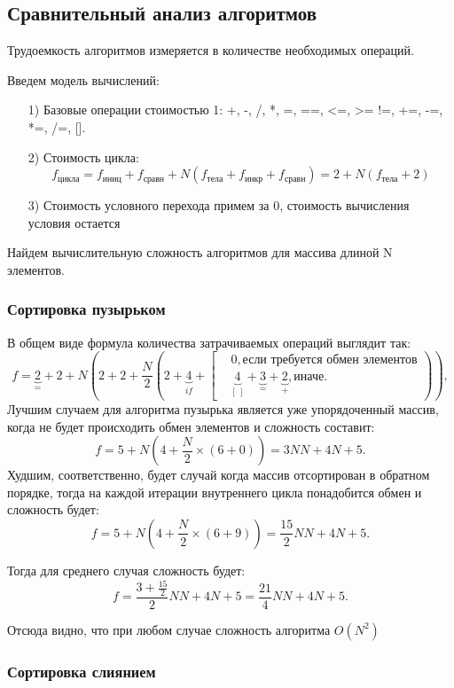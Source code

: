 \documentclass[a4paper,12pt]{article}
\begin{document}
	\subsection{Сравнительный анализ алгоритмов}
	 \label{fig:an_alg}
		Трудоемкость алгоритмов измеряется в количестве необходимых операций.
		
		Введем модель вычислений:
		\begin{enumerate}
		\item[1)] Базовые операции стоимостью 1: +, -, /, *, =, ==, <=, >= !=, +=, -=, *=, /=, [\:].
		\item[2)] Стоимость цикла:
		\[
		f_{\text{цикла}} = f_{\text{иниц}} + f_{\text{сравн}} + N(f_{\text{тела}} + f_{\text{инкр}} + f_{\text{сравн}}) = 2 + N(f_{\text{тела}} + 2)
		\]
		\item[3)]  Стоимость условного перехода примем за 0, стоимость вычисления условия остается
		
		\end{enumerate}
		Найдем вычислительную сложность алгоритмов для массива длиной N элементов.
		\subsubsection{Сортировка пузырьком}
		В общем виде формула количества затрачиваемых операций выглядит так:
		\[
			f = \underbrace{2}_{=} + 2 + N\left(2 + 2 +\frac{N}{2}\left(2 + \underbrace{4}_{if} + 				\left [
		\begin{aligned}
		&0,  \text{если требуется обмен элементов} \\
		&\underbrace{4}_{[\:]} + \underbrace{3}_{=} + \underbrace{2}_{+}, \text{иначе}.
		\end{aligned}
		\right.\right)\right),		
		\]
		Лучшим случаем для алгоритма пузырька является уже упорядоченный массив, когда не будет происходить обмен элементов и сложность составит:
		\[
		f = 5 + N(4 +\frac{N}{2}\times(6 + 0)) = 3NN + 4N + 5.		
		\]
		Худшим, соответственно, будет случай когда массив отсортирован в обратном порядке, тогда на каждой итерации внутреннего цикла понадобится обмен и сложность будет:
		\[
		f = 5 + N(4 +\frac{N}{2}\times(6 + 9)) = \frac{15}{2}NN + 4N + 5.			
		\]
		
		Тогда для среднего случая сложность будет:
		\[
		f =  \frac{3  + \frac{15}{2}}{2}NN + 4N + 5	= \frac{21}{4}NN + 4N + 5.	
		\]
		
		Отсюда видно, что при любом случае сложность алгоритма $O(N^2)$
		\subsubsection{Сортировка слиянием}
		
\end{document}
